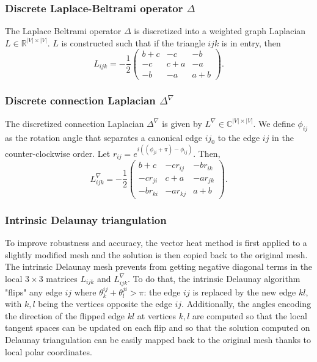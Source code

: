 \documentclass[sigconf, nonacm]{acmart}
\begin{document}
\subsubsection{Discrete Laplace-Beltrami operator $\Delta$}
The Laplace Beltrami operator $\Delta$ is discretized into a weighted graph Laplacian $L\in \mathbb{R}^{|V|\times |V|}$.
$L$ is constructed such that if the triangle $ijk$ is in entry, then 
$$L_{ijk} = -\frac{1}{2}\begin{pmatrix}
  b + c & -c & -b \\
  -c & c + a & -a \\
  -b & -a & a + b
  \end{pmatrix}.$$

\subsubsection{Discrete connection Laplacian $\Delta^\nabla$} The discretized connection Laplacian 
$\Delta^\nabla$ is given by $L^\nabla \in \mathbb{C}^{|V|\times|V|}$. We define 
$\phi_{ij}$ as the rotation angle that separates a canonical edge $ij_0$ to the edge
$ij$ in the counter-clockwise order. Let $r_{ij} = e^{i((\phi_{ji} + \pi) -  \phi_{ij})}$.
Then, $$
L^\nabla_{ijk} = -\frac{1}{2}\begin{pmatrix}
  b + c & -cr_{ij} & -br_{ik} \\
  -cr_{ji} & c + a & -ar_{jk} \\
  -br_{ki} & -ar_{kj} & a + b
  \end{pmatrix}.
$$
\subsubsection{Intrinsic Delaunay triangulation} To improve robustness and accuracy, the vector heat method is first applied to a 
slightly modified mesh and the solution is then copied back to the original mesh. The intrinsic Delaunay mesh prevents from getting 
negative diagonal terms in the local $3\times3$ matrices $L_{ijk}$ and $L^\nabla_{ijk}$. To do that, the intrinsic Delaunay algorithm 
"flips" any edge $ij$ where $\theta_k^{ij} + \theta_l^{ji}>\pi$: the edge $ij$ is replaced by the new edge $kl$, with $k,l$ being the 
vertices opposite the edge $ij$. Additionally, the angles encoding the direction of the flipped edge $kl$ at vertices $k,l$ are computed 
so that the local tangent spaces can be updated on each flip and so that the solution computed on Delaunay triangulation can be easily mapped 
back to the original mesh thanks to local polar coordinates. 
\end{document}

